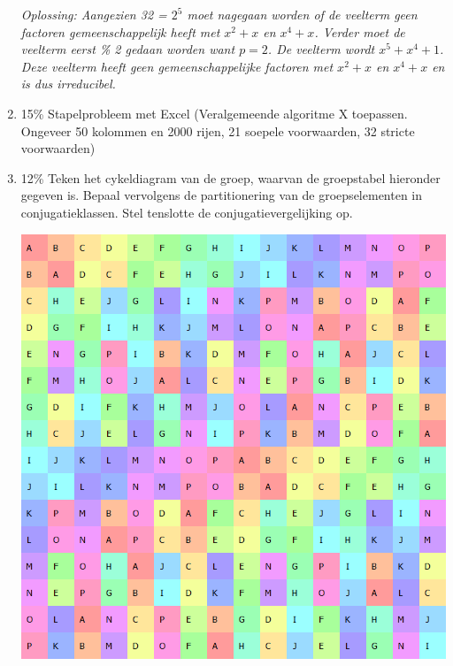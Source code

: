 \documentclass{article}
\def\warning#1{\color{red} #1 \color{black}}
\def\note#1{\color{cyan} #1 \color{black}}
\def\solution#1{\color{cyan}\textit{Oplossing: #1}\color{black}}
\begin{document}
\begin{enumerate}
{  \solution{Aangezien 32 = $2^5$ moet nagegaan worden of de veelterm geen factoren gemeenschappelijk heeft met $x^2 + x$ en $x^4 + x$. Verder moet de veelterm eerst \% 2 gedaan worden want $p = 2$. De veelterm wordt $x^5 + x^4 + 1$. Deze veelterm heeft geen gemeenschappelijke factoren met $x^2 + x$ en $x^4 + x$ en is dus irreducibel.}
  }
  \item {\note{15\%} \warning{Stapelprobleem met Excel (Veralgemeende algoritme X toepassen. Ongeveer 50 kolommen en 2000 rijen, 21 soepele voorwaarden, 32 stricte voorwaarden)}}
  \item {\note {12\%} Teken het cykeldiagram van de groep, waarvan de groepstabel hieronder gegeven is. Bepaal vervolgens de partitionering van de groepselementen in conjugatieklassen. Stel tenslotte de conjugatievergelijking op.
  \begin{center}
    \includegraphics[width=0.8\linewidth]{quasihedral_16}
  \end{center}
    
}
\end{enumerate}
\end{document}
